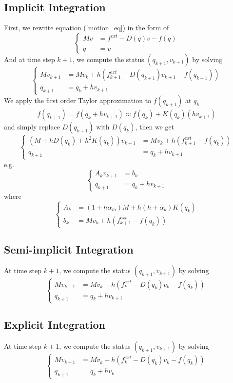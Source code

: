 \documentclass[twocolumn]{article}
\begin{document}
\subsection{Implicit Integration} \label{sec:implicit-integration}
First, we rewrite equation (\ref{motion_eq}) in the form of 
\[
\left\{ \begin{array}{rl}
    M\dot{v} &= f^{ext}- D(q)v - f(q)\\
    \dot{q} &= v
  \end{array} \right.\nonumber
\]
And at time step $k+1$, we compute the status $(q_{k+1},v_{k+1})$ by solving 
\[
\left\{ \begin{array}{rl}
    Mv _{k+1}  &= Mv _{k} +h(f^{ext}_{k+1} - D(q _{k+1} )v _{k+1}  - f(q _{k+1} ))\\
    {q} _{k+1} &= q _{k} + hv _{k+1} 
  \end{array} \right.\nonumber
\]
We apply the first order Taylor approximation to $f (q_{k+1}) $ at $q_k$
\[
f(q _{k+1}) = f(q_k + hv _{k+1} ) \approx f(q_k) + K(q_k)(hv _{k+1})
\]
and simply replace $D(q _{k+1} )$ with $D(q _{k} )$, then we get
\[
\left\{ \begin{array}{rl}
    (M+hD(q _{k}) + h^2K(q_k))v _{k+1}  &= Mv _{k} +h(f^{ext}_{k+1} - f(q _{k} ))\\
    {q} _{k+1} &= q _{k} + hv _{k+1} 
  \end{array} \right.\nonumber
\]
e.g.
\[
\left\{ \begin{array}{rl}
    A_k v _{k+1}  &= b_k\\
    {q} _{k+1} &= q _{k} + hv _{k+1} 
  \end{array} \right.\nonumber
\]
where 
\[
\left\{ \begin{array}{rl}
    A_k &= (1+h\alpha_m)M + h(h+\alpha_k)K(q_k) \\
    b_k &= Mv _{k} +h(f^{ext}_{k+1} - f(q _{k} ))
  \end{array} \right.\nonumber
\]
\subsection{Semi-implicit Integration}
At time step $k+1$, we compute the status $(q_{k+1},v_{k+1})$ by solving 
\[
\left\{ \begin{array}{rl}
    Mv _{k+1}  &= Mv _{k} +h(f^{ext}_{k} - D(q _{k} )v _{k}  - f(q _{k} ))\\
    {q} _{k+1} &= q _{k} + hv _{k+1} 
  \end{array} \right.\nonumber
\]

\subsection{Explicit Integration}
At time step $k+1$, we compute the status $(q_{k+1},v_{k+1})$ by solving 
\[
\left\{ \begin{array}{rl}
    Mv _{k+1}  &= Mv _{k} +h(f^{ext}_{k} - D(q _{k} )v _{k}  - f(q _{k} ))\\
    {q} _{k+1} &= q _{k} + hv _{k} 
  \end{array} \right.\nonumber
\]
\end{document}
